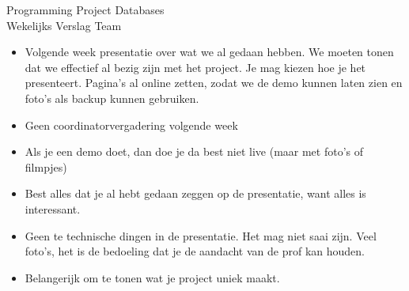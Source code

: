 \documentclass{article}
\newcounter{team}
\begin{document}
	
	\begin{Minutes}{Programming Project Databases \\ Wekelijks Verslag Team }
		\missingNoExcuse{/}
		\missingExcused{/}
		
		\maketitle
		
		\begin{itemize}
			\item Volgende week presentatie over wat we al gedaan hebben. We moeten tonen dat we effectief al bezig zijn met het project. Je mag kiezen hoe je het presenteert. Pagina's al online zetten, zodat we de demo kunnen laten zien en foto's als backup kunnen gebruiken.
			\item Geen coordinatorvergadering volgende week
			\item Als je een demo doet, dan doe je da best niet live (maar met foto's of filmpjes)
			\item Best alles dat je al hebt gedaan zeggen op de presentatie, want alles is interessant. 
			\item Geen te technische dingen in de presentatie. Het mag niet saai zijn. Veel foto's, het is de bedoeling dat je de aandacht van de prof kan houden.
			\item Belangerijk om te tonen wat je project uniek maakt. 
		\end{itemize}
		
		

			


\end{Minutes}
\end{document}

